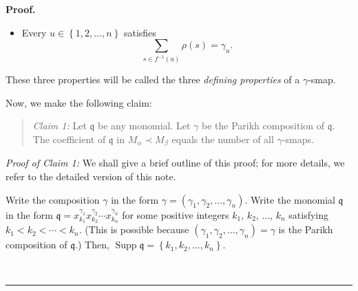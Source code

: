 \documentclass[numbers=enddot,12pt,final,onecolumn,notitlepage,abstracton]{scrartcl}%
\theoremstyle{definition}
\newenvironment{statement}{\begin{quote}}{\end{quote}}
\newenvironment{proof}[1][Proof]{\noindent\textbf{#1.} }{\ \rule{0.5em}{0.5em}}
\newenvironment{vershort}{}{}
\let\sumnonlimits\sum
\renewcommand{\sum}{\sumnonlimits\limits}
\begin{document}
\begin{proof}
\begin{itemize}
\item Every $u\in\left\{  1,2,\ldots,n\right\}  $ satisfies%
\[
\sum_{s\in f^{-1}\left(  u\right)  }\rho\left(  s\right)  =\gamma_{u}.
\]

\end{itemize}

These three properties will be called the three \textit{defining properties}
of a $\gamma$-smap.

Now, we make the following claim:

\begin{statement}
\textit{Claim 1:} Let $\mathfrak{q}$ be any monomial. Let $\gamma$ be the
Parikh composition of $\mathfrak{q}$. The coefficient of $\mathfrak{q}$ in
$M_{\alpha}\left.  \prec\right.  M_{\beta}$ equals the number of all $\gamma$-smaps.
\end{statement}

\begin{vershort}
\textit{Proof of Claim 1:} We shall give a brief outline of this proof; for
more details, we refer to the detailed version of this note.

Write the composition $\gamma$ in the form $\gamma=\left(  \gamma_{1}%
,\gamma_{2},\ldots,\gamma_{n}\right)  $. Write the monomial $\mathfrak{q}$ in
the form $\mathfrak{q}=x_{k_{1}}^{\gamma_{1}}x_{k_{2}}^{\gamma_{2}}\cdots
x_{k_{n}}^{\gamma_{n}}$ for some positive integers $k_{1}$, $k_{2}$, $\ldots$,
$k_{n}$ satisfying $k_{1}<k_{2}<\cdots<k_{n}$. (This is possible because
$\left(  \gamma_{1},\gamma_{2},\ldots,\gamma_{n}\right)  =\gamma$ is the
Parikh composition of $\mathfrak{q}$.) Then, $\operatorname*{Supp}%
\mathfrak{q}=\left\{  k_{1},k_{2},\ldots,k_{n}\right\}  $.


\end{vershort}
\end{proof}
\end{document}
